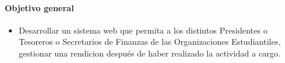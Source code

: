 \paragraph{Objetivo general}
\begin{itemize}
\item Desarrollar un sistema web que permita a los distintos Presidentes o Tesoreros o Secretarios de Finanzas de las Organizaciones Estudiantiles, gestionar una rendicion después de haber realizado la actividad a cargo.
\end{itemize}

